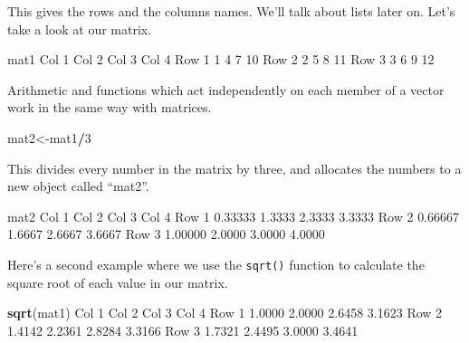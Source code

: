 \documentclass[
]{book}
\newenvironment{Shaded}{\begin{snugshade}}{\end{snugshade}}
\newcommand{\DecValTok}[1]{\textcolor[rgb]{0.00,0.00,0.81}{#1}}
\newcommand{\FloatTok}[1]{\textcolor[rgb]{0.00,0.00,0.81}{#1}}
\newcommand{\KeywordTok}[1]{\textcolor[rgb]{0.13,0.29,0.53}{\textbf{#1}}}
\newcommand{\NormalTok}[1]{#1}
\newcommand{\OperatorTok}[1]{\textcolor[rgb]{0.81,0.36,0.00}{\textbf{#1}}}
\begin{document}
This gives the rows and the columns names. We'll talk about lists later on. Let's take a look at our matrix.

\begin{Shaded}
\begin{Highlighting}[]
\NormalTok{mat1}
\NormalTok{      Col }\DecValTok{1}\NormalTok{ Col }\DecValTok{2}\NormalTok{ Col }\DecValTok{3}\NormalTok{ Col }\DecValTok{4}
\NormalTok{Row }\DecValTok{1}     \DecValTok{1}     \DecValTok{4}     \DecValTok{7}    \DecValTok{10}
\NormalTok{Row }\DecValTok{2}     \DecValTok{2}     \DecValTok{5}     \DecValTok{8}    \DecValTok{11}
\NormalTok{Row }\DecValTok{3}     \DecValTok{3}     \DecValTok{6}     \DecValTok{9}    \DecValTok{12}
\end{Highlighting}
\end{Shaded}

Arithmetic and functions which act independently on each member of a vector work in the same way with matrices.

\begin{Shaded}
\begin{Highlighting}[]
\NormalTok{mat2<-mat1}\OperatorTok{/}\DecValTok{3}
\end{Highlighting}
\end{Shaded}

This divides every number in the matrix by three, and allocates the numbers to a new object called ``mat2''.

\begin{Shaded}
\begin{Highlighting}[]
\NormalTok{mat2}
\NormalTok{        Col }\DecValTok{1}\NormalTok{  Col }\DecValTok{2}\NormalTok{  Col }\DecValTok{3}\NormalTok{  Col }\DecValTok{4}
\NormalTok{Row }\DecValTok{1} \FloatTok{0.33333} \FloatTok{1.3333} \FloatTok{2.3333} \FloatTok{3.3333}
\NormalTok{Row }\DecValTok{2} \FloatTok{0.66667} \FloatTok{1.6667} \FloatTok{2.6667} \FloatTok{3.6667}
\NormalTok{Row }\DecValTok{3} \FloatTok{1.00000} \FloatTok{2.0000} \FloatTok{3.0000} \FloatTok{4.0000}
\end{Highlighting}
\end{Shaded}

Here's a second example where we use the \texttt{sqrt()} function to calculate the square root of each value in our matrix.

\begin{Shaded}
\begin{Highlighting}[]
\KeywordTok{sqrt}\NormalTok{(mat1)}
\NormalTok{       Col }\DecValTok{1}\NormalTok{  Col }\DecValTok{2}\NormalTok{  Col }\DecValTok{3}\NormalTok{  Col }\DecValTok{4}
\NormalTok{Row }\DecValTok{1} \FloatTok{1.0000} \FloatTok{2.0000} \FloatTok{2.6458} \FloatTok{3.1623}
\NormalTok{Row }\DecValTok{2} \FloatTok{1.4142} \FloatTok{2.2361} \FloatTok{2.8284} \FloatTok{3.3166}
\NormalTok{Row }\DecValTok{3} \FloatTok{1.7321} \FloatTok{2.4495} \FloatTok{3.0000} \FloatTok{3.4641}
\end{Highlighting}
\end{Shaded}
\end{document}
